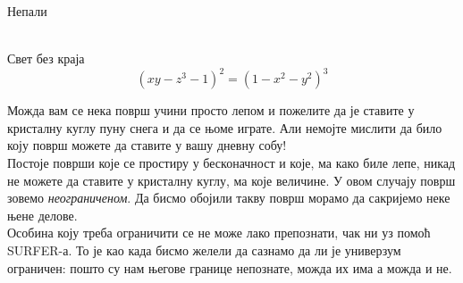 \documentclass[en]{./../../common/SurferDesc}%
\begin{document}
\footnotesize

\begin{surferPage}
  \begin{surferTitle}Непали\end{surferTitle}  \\
Свет без краја\\

\smallskip
\[(x y - z^3 -1)^2= (1 - x^2	- y^2)^3\]

\singlespacing
Можда вам се нека површ учини просто лепом и пожелите да је ставите у кристалну куглу пуну снега и да се њоме играте. Али немојте мислити да било коју површ можете да ставите у вашу дневну собу!
\\
\singlespacing
Постоје површи које се простиру у бесконачност и које, ма како биле лепе, никад не можете да ставите у кристалну куглу, ма које величине. У овом случају површ зовемо \textit{неограниченом}. Да бисмо обојили такву површ морамо да сакријемо неке њене делове.
\\
\singlespacing
Особина коју треба ограничити се не може лако препознати, чак ни уз помоћ SURFER-а. То је као када бисмо желели да сазнамо да ли је универзум ограничен: пошто су нам његове границе непознате, можда их има а можда и не.
  \begin{surferText}
     \end{surferText}
\end{surferPage}
\end{document}
